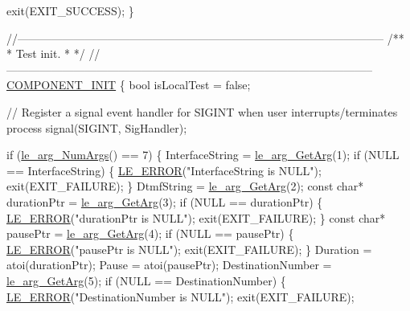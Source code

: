 \begin{DoxyCodeInclude}
{{{{{{{{{{{{    exit(EXIT\_SUCCESS);
\}

\textcolor{comment}{//--------------------------------------------------------------------------------------------------}\textcolor{comment}{}
\textcolor{comment}{/**}
\textcolor{comment}{ * Test init.}
\textcolor{comment}{ *}
\textcolor{comment}{ */}
\textcolor{comment}{//--------------------------------------------------------------------------------------------------}
\hyperlink{le__event_loop_8h_abdb9187a56836a93d19cc793cbd4b7ec}{COMPONENT\_INIT}
\{
    \textcolor{keywordtype}{bool} isLocalTest = \textcolor{keyword}{false};

    \textcolor{comment}{// Register a signal event handler for SIGINT when user interrupts/terminates process}
    signal(SIGINT, SigHandler);

    \textcolor{keywordflow}{if} (\hyperlink{le__args_8h_a6fbbeb423104e6eb92fe47ef42b7310a}{le\_arg\_NumArgs}() == 7)
    \{
        InterfaceString = \hyperlink{le__args_8h_a5ebca8229facd069785639cb3c1e273a}{le\_arg\_GetArg}(1);
        \textcolor{keywordflow}{if} (NULL == InterfaceString)
        \{
            \hyperlink{le__log_8h_a353590f91b3143a7ba3a416ae5a50c3d}{LE\_ERROR}(\textcolor{stringliteral}{"InterfaceString is NULL"});
            exit(EXIT\_FAILURE);
        \}
        DtmfString = \hyperlink{le__args_8h_a5ebca8229facd069785639cb3c1e273a}{le\_arg\_GetArg}(2);
        \textcolor{keyword}{const} \textcolor{keywordtype}{char}* durationPtr = \hyperlink{le__args_8h_a5ebca8229facd069785639cb3c1e273a}{le\_arg\_GetArg}(3);
        \textcolor{keywordflow}{if} (NULL == durationPtr)
        \{
            \hyperlink{le__log_8h_a353590f91b3143a7ba3a416ae5a50c3d}{LE\_ERROR}(\textcolor{stringliteral}{"durationPtr is NULL"});
            exit(EXIT\_FAILURE);
        \}
        \textcolor{keyword}{const} \textcolor{keywordtype}{char}* pausePtr = \hyperlink{le__args_8h_a5ebca8229facd069785639cb3c1e273a}{le\_arg\_GetArg}(4);
        \textcolor{keywordflow}{if} (NULL == pausePtr)
        \{
            \hyperlink{le__log_8h_a353590f91b3143a7ba3a416ae5a50c3d}{LE\_ERROR}(\textcolor{stringliteral}{"pausePtr is NULL"});
            exit(EXIT\_FAILURE);
        \}
        Duration = atoi(durationPtr);
        Pause = atoi(pausePtr);
        DestinationNumber = \hyperlink{le__args_8h_a5ebca8229facd069785639cb3c1e273a}{le\_arg\_GetArg}(5);
        \textcolor{keywordflow}{if} (NULL == DestinationNumber)
        \{
            \hyperlink{le__log_8h_a353590f91b3143a7ba3a416ae5a50c3d}{LE\_ERROR}(\textcolor{stringliteral}{"DestinationNumber is NULL"});
            exit(EXIT\_FAILURE);
}}}}}}}}}}}}
\end{DoxyCodeInclude}
